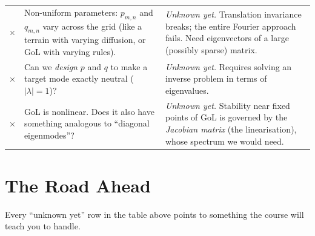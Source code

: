 \documentclass[11pt]{article}
\begin{document}
\begin{center}
\begin{tabular}{@{}p{}p{}p{}@{}}
$\times$
& Non-uniform parameters: $p_{m,n}$ and $q_{m,n}$ vary across the grid
  (like a terrain with varying diffusion, or GoL with varying rules).
& \emph{Unknown yet.}  Translation invariance breaks; the entire Fourier
  approach fails.  Need eigenvectors of a large (possibly sparse) matrix. \\

$\times$
& Can we \emph{design} $p$ and $q$ to make a target mode
  exactly neutral ($|\lambda|=1$)?
& \emph{Unknown yet.}  Requires solving an inverse problem in terms of
  eigenvalues. \\

$\times$
& GoL is nonlinear.  Does it also have something analogous to
  ``diagonal eigenmodes''?
& \emph{Unknown yet.}  Stability near fixed points of GoL is governed by the
  \emph{Jacobian matrix} (the linearisation), whose spectrum we would need. \\

\bottomrule
\end{tabular}
\end{center}


\section*{The Road Ahead}

\noindent
Every ``unknown yet'' row in the table above points to something the
course will teach you to handle.
\end{document}
